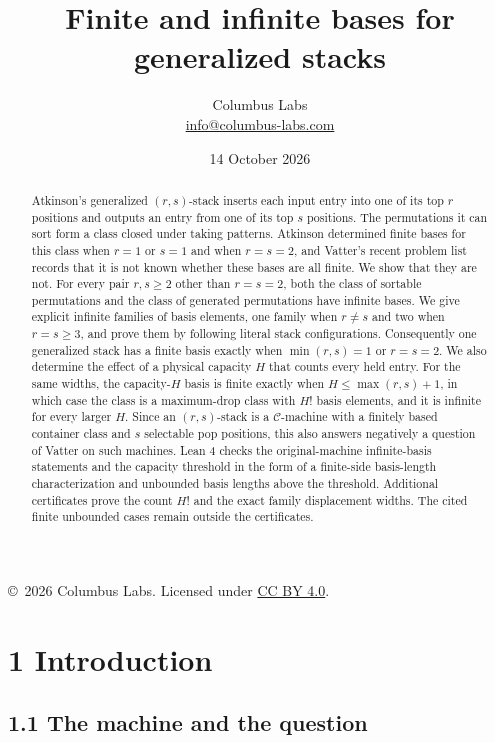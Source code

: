 \documentclass[11pt,letterpaper]{article}
\title{Finite and infinite bases for generalized stacks}
\author{Columbus Labs\\\small\href{mailto:info@columbus-labs.com}{info@columbus-labs.com}}
\date{14 October 2026}
\begin{document}
\maketitle
\begin{center}\footnotesize\copyright\ 2026 Columbus Labs. Licensed under \href{https://creativecommons.org/licenses/by/4.0/}{CC BY 4.0}.\end{center}
\vspace{-1em}
\begin{abstract}
Atkinson's generalized \((r,s)\)-stack inserts each input entry into one
of its top \(r\) positions and outputs an entry from one of its top
\(s\) positions. The permutations it can sort form a class closed under
taking patterns. Atkinson determined finite bases for this class when
\(r=1\) or \(s=1\) and when \(r=s=2\), and Vatter's recent problem list
records that it is not known whether these bases are all finite. We show
that they are not. For every pair \(r,s\ge 2\) other than \(r=s=2\),
both the class of sortable permutations and the class of generated
permutations have infinite bases. We give explicit infinite families of
basis elements, one family when \(r\ne s\) and two when \(r=s\ge 3\),
and prove them by following literal stack configurations. Consequently
one generalized stack has a finite basis exactly when \(\min(r,s)=1\) or
\(r=s=2\). We also determine the effect of a physical capacity \(H\)
that counts every held entry. For the same widths, the capacity-\(H\)
basis is finite exactly when \(H\le\max(r,s)+1\), in which case the
class is a maximum-drop class with \(H!\) basis elements, and it is
infinite for every larger \(H\). Since an \((r,s)\)-stack is a
\(\mathcal C\)-machine with a finitely based container class and \(s\)
selectable pop positions, this also answers negatively a question of
Vatter on such machines. Lean 4 checks the original-machine
infinite-basis statements and the capacity threshold in the form of a
finite-side basis-length characterization and unbounded basis lengths
above the threshold. Additional certificates prove the count \(H!\) and the exact family displacement widths. The cited finite unbounded cases remain outside the certificates.
\end{abstract}

\section{1 Introduction}\label{introduction}

\subsection{1.1 The machine and the
question}\label{the-machine-and-the-question}
\end{document}

